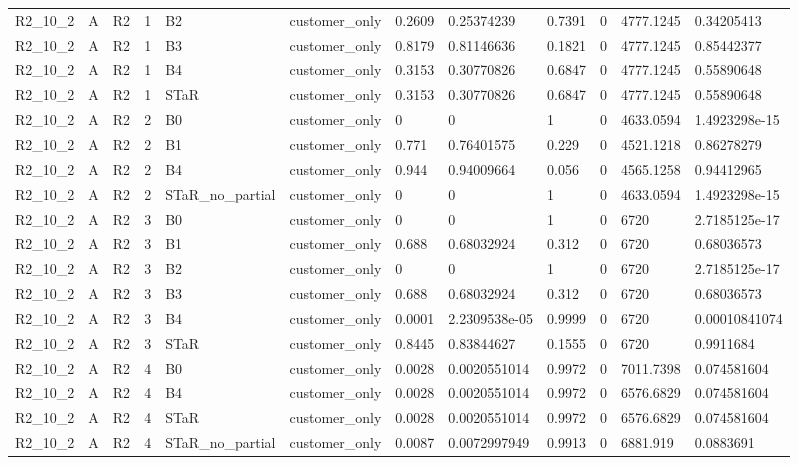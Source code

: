 \begin{longtable}{llllllllllll}
R2\_10\_2 & A & R2 & 1 & B2 & customer\_only & 0.2609 & 0.25374239 & 0.7391 & 0 & 4777.1245 & 0.34205413 \\
R2\_10\_2 & A & R2 & 1 & B3 & customer\_only & 0.8179 & 0.81146636 & 0.1821 & 0 & 4777.1245 & 0.85442377 \\
R2\_10\_2 & A & R2 & 1 & B4 & customer\_only & 0.3153 & 0.30770826 & 0.6847 & 0 & 4777.1245 & 0.55890648 \\
R2\_10\_2 & A & R2 & 1 & STaR & customer\_only & 0.3153 & 0.30770826 & 0.6847 & 0 & 4777.1245 & 0.55890648 \\
R2\_10\_2 & A & R2 & 2 & B0 & customer\_only & 0 & 0 & 1 & 0 & 4633.0594 & 1.4923298e-15 \\
R2\_10\_2 & A & R2 & 2 & B1 & customer\_only & 0.771 & 0.76401575 & 0.229 & 0 & 4521.1218 & 0.86278279 \\
R2\_10\_2 & A & R2 & 2 & B4 & customer\_only & 0.944 & 0.94009664 & 0.056 & 0 & 4565.1258 & 0.94412965 \\
R2\_10\_2 & A & R2 & 2 & STaR\_no\_partial & customer\_only & 0 & 0 & 1 & 0 & 4633.0594 & 1.4923298e-15 \\
R2\_10\_2 & A & R2 & 3 & B0 & customer\_only & 0 & 0 & 1 & 0 & 6720 & 2.7185125e-17 \\
R2\_10\_2 & A & R2 & 3 & B1 & customer\_only & 0.688 & 0.68032924 & 0.312 & 0 & 6720 & 0.68036573 \\
R2\_10\_2 & A & R2 & 3 & B2 & customer\_only & 0 & 0 & 1 & 0 & 6720 & 2.7185125e-17 \\
R2\_10\_2 & A & R2 & 3 & B3 & customer\_only & 0.688 & 0.68032924 & 0.312 & 0 & 6720 & 0.68036573 \\
R2\_10\_2 & A & R2 & 3 & B4 & customer\_only & 0.0001 & 2.2309538e-05 & 0.9999 & 0 & 6720 & 0.00010841074 \\
R2\_10\_2 & A & R2 & 3 & STaR & customer\_only & 0.8445 & 0.83844627 & 0.1555 & 0 & 6720 & 0.9911684 \\
R2\_10\_2 & A & R2 & 4 & B0 & customer\_only & 0.0028 & 0.0020551014 & 0.9972 & 0 & 7011.7398 & 0.074581604 \\
R2\_10\_2 & A & R2 & 4 & B4 & customer\_only & 0.0028 & 0.0020551014 & 0.9972 & 0 & 6576.6829 & 0.074581604 \\
R2\_10\_2 & A & R2 & 4 & STaR & customer\_only & 0.0028 & 0.0020551014 & 0.9972 & 0 & 6576.6829 & 0.074581604 \\
R2\_10\_2 & A & R2 & 4 & STaR\_no\_partial & customer\_only & 0.0087 & 0.0072997949 & 0.9913 & 0 & 6881.919 & 0.0883691 \\

\end{longtable}
